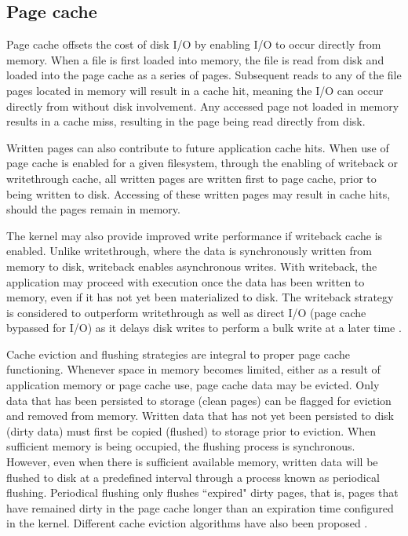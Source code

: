 \documentclass[conference]{IEEEtran}
\begin{document}
        \subsection{Page cache}

        Page cache offsets the cost of disk I/O by enabling I/O to occur directly from memory.
        When a file is first loaded into memory, the file is read from disk and loaded into the page cache as
        a series of pages. Subsequent reads to any of the file pages located in memory will result in
        a cache hit, meaning the I/O can occur directly from without disk involvement.
        Any accessed page not loaded in memory results in a cache miss, resulting in
        the page being read directly from disk.
        
        Written pages can also contribute to future application cache hits. When use of page cache
        is enabled for a given filesystem, through the enabling of writeback or writethrough cache,
        all written pages are written first to page cache, prior to being written to disk.
        Accessing of these written pages may result in cache hits, should the pages remain in memory.

        The kernel may also provide improved write performance if writeback cache is enabled. Unlike writethrough,
        where the data is synchronously written from memory to disk, writeback enables asynchronous writes.
        With writeback, the application may proceed with execution once the data has been
        written to memory, even if it has not yet been materialized to disk.  
        The writeback strategy is considered to outperform writethrough as well as
        direct I/O (page cache bypassed for I/O) as it delays disk writes to perform a bulk write at a later time
        \cite{linuxdev3rd2010}.

        Cache eviction and flushing strategies are integral to proper page cache functioning.
        Whenever space in memory becomes limited, either as a result of application memory
        or page cache use, page cache data may be evicted. Only data that
        has been persisted to storage (clean pages) can be flagged for eviction and removed from
        memory. Written data that has not yet been persisted to disk (dirty data) must first
        be copied (flushed) to storage prior to eviction. When sufficient memory is
        being occupied, the flushing process is synchronous. However, even when
        there is sufficient available memory, written data will be flushed to disk
        at a predefined interval through a process known as periodical flushing.
        Periodical flushing only flushes ``expired" dirty pages, that is, pages that
        have remained dirty in the
        page cache longer than an expiration time configured in the kernel.
        Different cache eviction algorithms have also been proposed
        \cite{owda2014comparison}.
\end{document}
